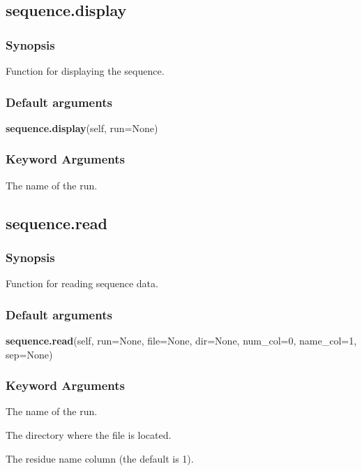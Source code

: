 \subsection{sequence.display}


\subsubsection{Synopsis}

Function for displaying the sequence.

\subsubsection{Default arguments}

\textsf{\textbf{sequence.display}(self, run=None)}


\subsubsection{Keyword Arguments}

  The name of the run.


\newpage

\subsection{sequence.read}


\subsubsection{Synopsis}

Function for reading sequence data.

\subsubsection{Default arguments}

\textsf{\textbf{sequence.read}(self, run=None, file=None, dir=None, num\_col=0, name\_col=1, sep=None)}


\subsubsection{Keyword Arguments}

  The name of the run.

  The directory where the file is located.

  The residue name column (the default is 1).


